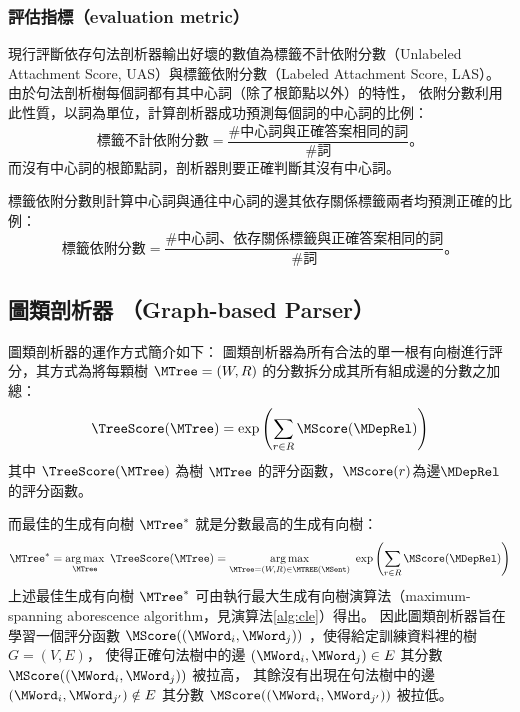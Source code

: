 \subsubsection{評估指標（evaluation metric）}

現行評斷依存句法剖析器輸出好壞的數值為標籤不計依附分數（Unlabeled Attachment Score, UAS）與標籤依附分數（Labeled Attachment Score, LAS）。
由於句法剖析樹每個詞都有其中心詞（除了根節點以外）的特性，
依附分數利用此性質，以詞為單位，計算剖析器成功預測每個詞的中心詞的比例：
\begin{equation}
    \textrm{標籤不計依附分數} = \frac{\#\textrm{中心詞與正確答案相同的詞}}{\#\textrm{詞}} \textrm{。}
\end{equation}
而沒有中心詞的根節點詞，剖析器則要正確判斷其沒有中心詞。

標籤依附分數則計算中心詞與通往中心詞的邊其依存關係標籤兩者均預測正確的比例：
\begin{equation}
    \textrm{標籤依附分數} = \frac{\#\textrm{中心詞、依存關係標籤與正確答案相同的詞}}{\#\textrm{詞}} \textrm{。}
\end{equation}



\subsection{圖類剖析器 （Graph-based Parser）}
\label{subsec:graph_parser}

圖類剖析器的運作方式簡介如下：
圖類剖析器為所有合法的單一根有向樹進行評分，其方式為將每顆樹 $\MTree = (W, R)$ 的分數拆分成其所有組成邊的分數之加總：
\begin{equation}
    \TreeScore (\MTree) = \exp{ \left( \sum_{r \in R} \MScore(\MDepRel) \right) }
\end{equation}
其中 $\TreeScore(\MTree)$ 為樹 $\MTree$ 的評分函數，$\MScore(r)$為邊$\MDepRel$的評分函數。

而最佳的生成有向樹 $\MTree^{*}$ 就是分數最高的生成有向樹：
\begin{equation}
    \MTree^{*} = \argmax_{\MTree}\ \TreeScore (\MTree) = \argmax_{\MTree = (W, R) \in \MakeUppercase{\MTree}(\MSent)}\ \exp{ \left( \sum_{r \in R} \MScore(\MDepRel) \right) }
\end{equation}
上述最佳生成有向樹 $\MTree^{*}$ 可由執行最大生成有向樹演算法（maximum-spanning aborescence algorithm，見演算法\ref{alg:cle}）得出。
因此圖類剖析器旨在學習一個評分函數 $\MScore((\MWord_{i}, \MWord_{j}))$ ，使得給定訓練資料裡的樹$G=(V, E)$，
使得正確句法樹中的邊 $(\MWord_{i}, \MWord_{j}) \in E$ 其分數 $\MScore((\MWord_{i}, \MWord_{j}))$ 被拉高，
其餘沒有出現在句法樹中的邊 $(\MWord_{i}, \MWord_{j'}) \notin E$ 其分數 $\MScore((\MWord_{i}, \MWord_{j'}))$ 被拉低。

